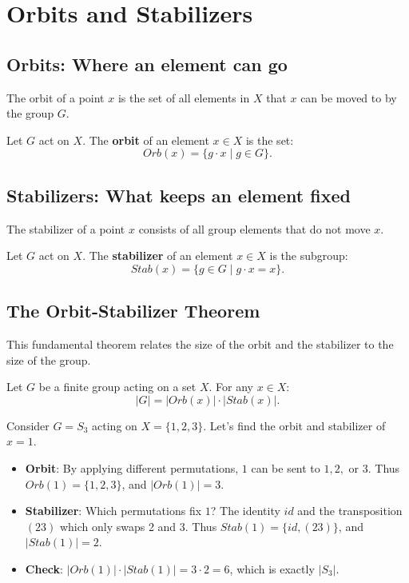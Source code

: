 \section{Orbits and Stabilizers}

\subsection{Orbits: Where an element can go}
The orbit of a point $x$ is the set of all elements in $X$ that $x$ can be moved to by the group $G$.

\begin{definition}[Orbit]
Let $G$ act on $X$. The \textbf{orbit} of an element $x \in X$ is the set:
\[ Orb(x) = \{ g \cdot x \mid g \in G \}. \]
\end{definition}

\subsection{Stabilizers: What keeps an element fixed}
The stabilizer of a point $x$ consists of all group elements that do not move $x$.

\begin{definition}[Stabilizer]
Let $G$ act on $X$. The \textbf{stabilizer} of an element $x \in X$ is the subgroup:
\[ Stab(x) = \{ g \in G \mid g \cdot x = x \}. \]
\end{definition}

\subsection{The Orbit-Stabilizer Theorem}
This fundamental theorem relates the size of the orbit and the stabilizer to the size of the group.

\begin{theorem}
Let $G$ be a finite group acting on a set $X$. For any $x \in X$:
\[ |G| = |Orb(x)| \cdot |Stab(x)|. \]
\end{theorem}

\begin{example}
Consider $G = S_3$ acting on $X = \{1, 2, 3\}$. Let's find the orbit and stabilizer of $x = 1$.
\begin{itemize}
    \item \textbf{Orbit}: By applying different permutations, $1$ can be sent to $1, 2,$ or $3$. Thus $Orb(1) = \{1, 2, 3\}$, and $|Orb(1)| = 3$.
    \item \textbf{Stabilizer}: Which permutations fix $1$? The identity $id$ and the transposition $(23)$ which only swaps 2 and 3. Thus $Stab(1) = \{id, (23)\}$, and $|Stab(1)| = 2$.
    \item \textbf{Check}: $|Orb(1)| \cdot |Stab(1)| = 3 \cdot 2 = 6$, which is exactly $|S_3|$.
\end{itemize}
\end{example}

